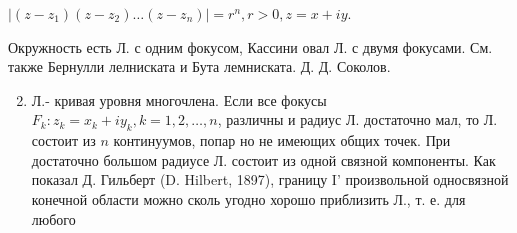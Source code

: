 \documentclass[10pt]{article}
\begin{document}
$\left|\left(z-z_{1}\right)\left(z-z_{2}\right) \ldots\left(z-z_{n}\right)\right|=r^{n}, r>0, z=x+i y$.



Окружность есть Л. с одним фокусом, Кассини овал Л. с двумя фокусами. См. также Бернулли лелниската и Бута лемниската. Д. Д. Соколов.



\begin{enumerate}

  \setcounter{enumi}{1}

  \item Л.- кривая уровня многочлена. Если все фокусы $F_{k}: z_{k}=x_{k}+i y_{k}, k=1,2, \ldots, n$, различны и радиус Л. достаточно мал, то Л. состоит из $n$ континуумов, попар но не имеющих общих точек. При достаточно большом радиусе Л. состоит из одной связной компоненты. Как показал Д. Гильберт (D. Hilbert, 1897), границу I' произвольной односвязной конечной области можно сколь угодно хорошо приблизить Л., т. е. для любого

\end{enumerate}
\end{document}
